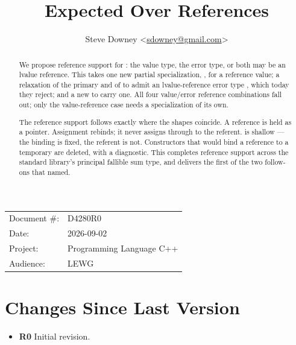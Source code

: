 \documentclass[a4paper,10pt,oneside,openany,final,article]{memoir}
\begin{document}
\title{Expected Over References}
\author{
  Steve Downey \small<\href{mailto:sdowney@gmail.com}{sdowney@gmail.com}> \\
}
\date{} %
\maketitle

\begin{flushright}
  \begin{tabular}{ll}
    Document \#: & D4280R0 \\
    Date: & 2026-09-02 \\
    Project: & Programming Language C++ \\
    Audience: & LEWG
  \end{tabular}
\end{flushright}

\begin{abstract}
  We propose reference support for : the value type,
  the error type, or both may be an lvalue reference. This takes one new
  partial specialization, , for a reference value; a
  relaxation of the primary  and of
   to admit an lvalue-reference error type ,
  which today they reject; and a new  to carry one. All
  four value/error reference combinations fall out; only the value-reference
  case needs a specialization of its own.

  The reference support follows  \cite{P2988R12}
  exactly where the shapes coincide. A reference is held as a pointer.
  Assignment rebinds; it never assigns through to the referent. 
  is shallow --- the binding is fixed, the referent is not. Constructors that
  would bind a reference to a temporary are deleted, with a diagnostic. This
  completes reference support across the standard library's principal
  fallible sum type, and delivers the first of the two follow-ons that
  \cite{P2988R12} named.
\end{abstract}

\tableofcontents*

\chapter*{Changes Since Last Version}

\begin{itemize}
\item \textbf{R0} Initial revision.
\end{itemize}
\end{document}

